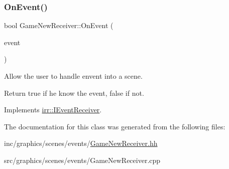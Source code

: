 \subsubsection{\texorpdfstring{On\+Event()}{OnEvent()}}
{\footnotesize\ttfamily bool Game\+New\+Receiver\+::\+On\+Event (\begin{DoxyParamCaption}\item[{const \hyperlink{structirr_1_1SEvent}{irr\+::\+S\+Event} \&}]{event }\end{DoxyParamCaption})\hspace{0.3cm}{\ttfamily [virtual]}}



Allow the user to handle envent into a scene. 

Return true if he know the event, false if not. 

Implements \hyperlink{classirr_1_1IEventReceiver_a571f744ceffc3b4fe8a81f529163eb97}{irr\+::\+I\+Event\+Receiver}.



The documentation for this class was generated from the following files\+:\begin{DoxyCompactItemize}
\item 
inc/graphics/scenes/events/\hyperlink{GameNewReceiver_8hh}{Game\+New\+Receiver.\+hh}\item 
src/graphics/scenes/events/Game\+New\+Receiver.\+cpp\end{DoxyCompactItemize}
